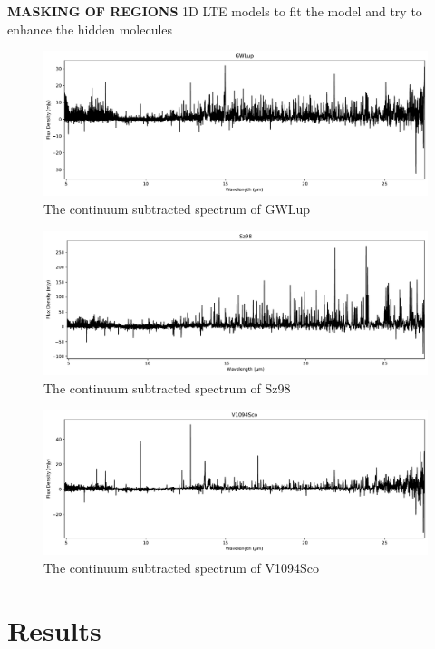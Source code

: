 \documentclass[twoside, single, authoryear, semicolon]{lion-msc}
\newcommand{\4}{$_4$}
\newcommand{\3}{$_3$}
\newcommand{\2}{$_2$}
\begin{document}
\textbf{MASKING OF REGIONS}
1D LTE models to fit the model and try to enhance the hidden molecules
\begin{figure}[!ht]
    \centering
    \includegraphics[width=\linewidth]{Figures/FullSpectrum_GWLup.pdf}
    \caption{The continuum subtracted spectrum of GWLup}
    \label{fig:GWLup}
\end{figure}
\begin{figure}[!ht]
    \centering
    \includegraphics[width=\linewidth]{Figures/FullSpectrum_Sz98.pdf}
    \caption{The continuum subtracted spectrum of Sz98}
    \label{fig:Sz98}
\end{figure}
\begin{figure}[!ht]
    \centering
    \includegraphics[width=\linewidth]{Figures/FullSpectrum_V1094Sco.pdf}
    \caption{The continuum subtracted spectrum of V1094Sco}
    \label{fig:V1094Sco}
\end{figure}



\chapter{Results}
\end{document}
